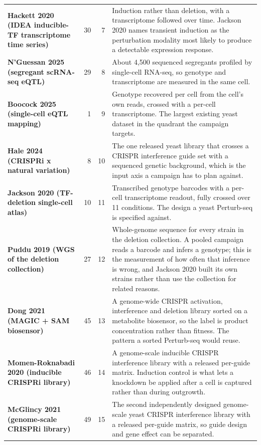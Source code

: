\begin{longtable}{@{}L{46mm} r@{\hspace{6pt}} r@{\hspace{6pt}} L{104mm}@{}}
\addlinespace[5pt]
\textbf{Hackett 2020 (IDEA inducible-TF transcriptome time series)} & 30 & 7 & Induction rather than deletion, with a transcriptome followed over time. Jackson 2020 names transient induction as the perturbation modality most likely to produce a detectable expression response. \\
\addlinespace[5pt]
\textbf{N'Guessan 2025 (segregant scRNA-seq eQTL)} & 29 & 8 & About 4,500 sequenced segregants profiled by single-cell RNA-seq, so genotype and transcriptome are measured in the same cell. \\
\addlinespace[5pt]
\textbf{Boocock 2025 (single-cell eQTL mapping)} & 1 & 9 & Genotype recovered per cell from the cell's own reads, crossed with a per-cell transcriptome. The largest existing yeast dataset in the quadrant the campaign targets. \\
\addlinespace[5pt]
\textbf{Hale 2024 (CRISPRi x natural variation)} & 8 & 10 & The one released yeast library that crosses a CRISPR interference guide set with a sequenced genetic background, which is the input axis a campaign has to plan against. \\
\addlinespace[5pt]
\textbf{Jackson 2020 (TF-deletion single-cell atlas)} & 10 & 11 & Transcribed genotype barcodes with a per-cell transcriptome readout, fully crossed over 11 conditions. The design a yeast Perturb-seq is specified against. \\
\addlinespace[5pt]
\textbf{Puddu 2019 (WGS of the deletion collection)} & 27 & 12 & Whole-genome sequence for every strain in the deletion collection. A pooled campaign reads a barcode and infers a genotype; this is the measurement of how often that inference is wrong, and Jackson 2020 built its own strains rather than use the collection for related reasons. \\
\addlinespace[5pt]
\textbf{Dong 2021 (MAGIC + SAM biosensor)} & 45 & 13 & A genome-wide CRISPR activation, interference and deletion library sorted on a metabolite biosensor, so the label is product concentration rather than fitness. The pattern a sorted Perturb-seq would reuse. \\
\addlinespace[5pt]
\textbf{Momen-Roknabadi 2020 (inducible CRISPRi library)} & 46 & 14 & A genome-scale inducible CRISPR interference library with a released per-guide matrix. Induction control is what lets a knockdown be applied after a cell is captured rather than during outgrowth. \\
\addlinespace[5pt]
\textbf{McGlincy 2021 (genome-scale CRISPRi library)} & 49 & 15 & The second independently designed genome-scale yeast CRISPR interference library with a released per-guide matrix, so guide design and gene effect can be separated. \\

\end{longtable}
